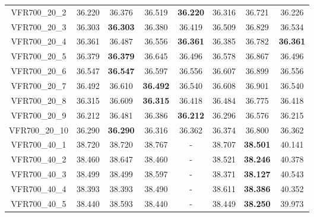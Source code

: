\begin{tabular}{cc|ccc|ccc}
VFR700\_20\_2      & 36.220           & 36.376           & 36.519           & {\bf 36.220}     & 36.316           & 36.721           & 36.226          \\ 
VFR700\_20\_3      & 36.303           & {\bf 36.303}     & 36.380           & 36.419           & 36.509           & 36.829           & 36.534          \\ 
VFR700\_20\_4      & 36.361           & 36.487           & 36.556           & {\bf 36.361}     & 36.385           & 36.782           & {\bf 36.361}    \\ 
VFR700\_20\_5      & 36.379           & {\bf 36.379}     & 36.645           & 36.496           & 36.578           & 36.867           & 36.496          \\ 
VFR700\_20\_6      & 36.547           & {\bf 36.547}     & 36.597           & 36.556           & 36.607           & 36.899           & 36.556          \\ 
VFR700\_20\_7      & 36.492           & 36.610           & {\bf 36.492}     & 36.540           & 36.608           & 36.901           & 36.540          \\ 
VFR700\_20\_8      & 36.315           & 36.609           & {\bf 36.315}     & 36.418           & 36.484           & 36.775           & 36.418          \\ 
VFR700\_20\_9      & 36.212           & 36.481           & 36.386           & {\bf 36.212}     & 36.296           & 36.576           & 36.215          \\ 
VFR700\_20\_10     & 36.290           & {\bf 36.290}     & 36.316           & 36.362           & 36.374           & 36.800           & 36.362          \\ 
VFR700\_40\_1      & 38.720           & 38.720           & 38.767           & -                & 38.707           & {\bf 38.501}     & 40.141          \\ 
VFR700\_40\_2      & 38.460           & 38.647           & 38.460           & -                & 38.521           & {\bf 38.246}     & 40.378          \\ 
VFR700\_40\_3      & 38.499           & 38.499           & 38.597           & -                & 38.371           & {\bf 38.127}     & 40.543          \\ 
VFR700\_40\_4      & 38.393           & 38.393           & 38.490           & -                & 38.611           & {\bf 38.386}     & 40.352          \\ 
VFR700\_40\_5      & 38.440           & 38.593           & 38.440           & -                & 38.449           & {\bf 38.250}     & 39.973          \\ 

\end{tabular}
